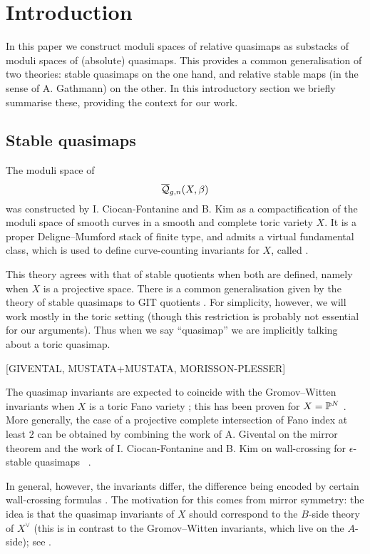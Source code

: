 \section{Introduction}
In this paper we construct moduli spaces of relative quasimaps as substacks of moduli spaces of (absolute) quasimaps. This provides a common generalisation of two theories: stable quasimaps on the one hand, and relative stable maps (in the sense of A. Gathmann) on the other. In this introductory section we briefly summarise these, providing the context for our work.

\subsection{Stable quasimaps}
The moduli space of 
\begin{equation*}\overline{\mathcal Q}_{g,n}(X,\beta)\end{equation*}
was constructed by I. Ciocan-Fontanine and B. Kim \cite{CF-K} as a compactification of the moduli space of smooth curves in a smooth and complete toric variety $X$. It is a proper Deligne--Mumford stack of finite type, and admits a virtual fundamental class, which is used to define curve-counting invariants for $X$, called .

This theory agrees with that of stable quotients \cite{MOP} when both are defined, namely when $X$ is a projective space.  There is a common generalisation given by the theory of stable quasimaps to GIT quotients \cite{CFKM}. For simplicity, however, we will work mostly in the toric setting (though this restriction is probably not essential for our arguments). Thus when we say ``quasimap'' we are implicitly talking about a toric quasimap.

[GIVENTAL, MUSTATA+MUSTATA, MORISSON-PLESSER]

The quasimap invariants are expected to coincide with the Gromov--Witten invariants when $X$ is a toric Fano variety \cite{CM}; this has been proven for $X=\mathbb P^N$ \cite[Theorem 3]{MOP} \cite[\S 5.4]{Manolache-Push}. More generally, the case of a projective complete intersection of Fano index at least $2$ can be obtained by combining the work of A. Givental on the mirror theorem \cite[Theorem 0.1]{Givental-mirror} and the work of I. Ciocan-Fontanine and B. Kim on wall-crossing for $\epsilon$-stable quasimaps \cite[Conjecture 7.2.10]{CF-K}\  \cite[\S 5.5 and Conjecture 6.3.1]{CF-K-wallcrossing}.

In general, however, the invariants differ, the difference being encoded by certain wall-crossing formulas \cite{CF-K-wallcrossing}. The motivation for this comes from mirror symmetry: the idea is that the quasimap invariants of $X$ should correspond to the $B$-side theory of $X^\vee$ (this is in contrast to the Gromov--Witten invariants, which live on the $A$-side); see \cite[\S 7]{CF-K}.

